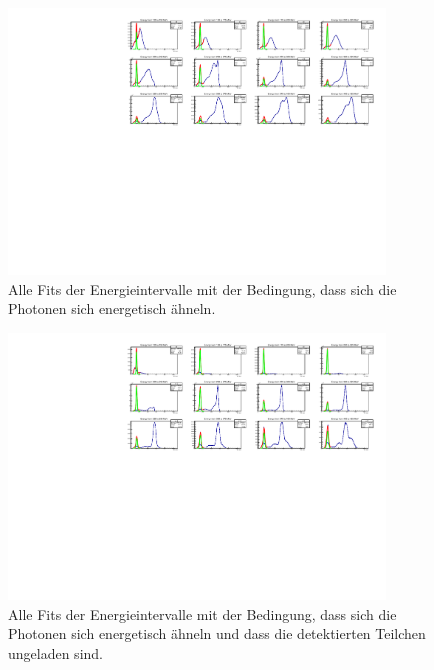 \documentclass[a4paper,11pt,oneside,final,german,openbib,pdftex]{scrbook}
\begin{document}
{\begin{appendix}

\begin{figure}[h!]
	\begin{center}
		\includegraphics[width=100mm]{NewCalib/Strahlzeit2014/20171904RealIntervalAllFits}
		\caption{Alle Fits der Energieintervalle mit der Bedingung, dass sich die Photonen sich energetisch ähneln.}
		\label{fig:similarenergyallfits}
	\end{center}
\end{figure}

\begin{figure}[h!]
	\begin{center}
		\includegraphics[width=100mm]{NewCalib/Strahlzeit2014/20171904RealUnchargedAllFits}
		\caption{Alle Fits der Energieintervalle mit der Bedingung, dass sich die Photonen sich energetisch ähneln und dass die detektierten Teilchen ungeladen sind.}
		\label{fig:similarenergyallfitsuncharged}
	\end{center}
\end{figure}


\end{appendix}}
\end{document}
